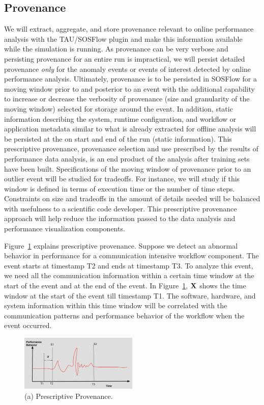 \subsection{Provenance}
\label{subsection:features}
We will extract, aggregate, and store provenance relevant to online performance analysis with the TAU/SOSFlow plugin and make this information available while the simulation is running.  As provenance can be very verbose and persisting provenance for an entire run is impractical, we will persist detailed provenance {\em only} for the anomaly events or events of interest detected by online performance analysis.  Ultimately, provenance is to be persisted in SOSFlow for a moving window prior to and posterior to an event with the additional capability to increase or decrease the verbosity of provenance (size and granularity of the moving window) selected for storage around the event.  In addition, static information describing the system, runtime configuration, and  workflow or application metadata similar to what is already extracted for offline analysis will be persisted at the on start and end of the run (static information).  This prescriptive provenance,  provenance selection and use prescribed by the results of performance data analysis, is an end product of the analysis after training sets have been built.
Specifications of the moving window of provenance prior to an outlier event will be studied for tradeoffs.  For instance, we will study if this window is defined in terms of execution time or the number of time steps.  Constraints on size and tradeoffs in the amount of details needed will be balanced with usefulness to a scientific code developer.
This prescriptive provenance approach will help reduce the information passed to the data analysis and performance visualization components.

Figure~\ref{designfig:2} explains prescriptive provenance. Suppose we detect an abnormal behavior in performance for a communication intensive workflow component. The event starts at timestamp T2 and ends at timestamp T3. To analyze this event, we need all the communication information within a certain time window at the start of the event and at the end of the event. In Figure~\ref{designfig:2}, ${\bf{X}}$ shows the time window at the start of the event till timestamp T1. The software, hardware, and system information within this time window will be correlated with the communication patterns and performance behavior of the workflow when the event occurred.

\begin{figure}[th!]
 \centering
  \includegraphics[width=0.5\textwidth]{Figs/Provenance}
 \caption{(a) Prescriptive Provenance.}
\label{designfig:2}     
 \end{figure}

